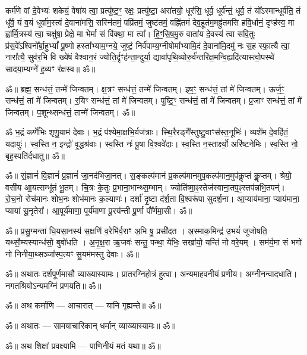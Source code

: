 कर्म॑णे वां दे॒वेभ्यः॑ शकेयं॒ वेषा॑य त्वा॒ प्रत्यु॑ष्ट॒ꣳ॒ रक्षः॒ प्रत्यु॑ष्टा॒ अरा॑तयो॒ धूर॑सि॒
धूर्व॒ धूर्व॑न्तं॒ धूर्व॒ तं यो᳚ऽस्मान्धूर्व॑ति॒ तं धू᳚र्व॒ यं व॒यं धूर्वा॑म॒स्त्वं दे॒वाना॑मसि॒
सस्नि॑तमं॒ पप्रि॑तमं॒ जुष्ट॑तमं॒ वह्नि॑तमं देव॒हूत॑म॒मह्रु॑तमसि हवि॒र्धानं॒ दृꣳह॑स्व॒ मा
ह्वा᳚र्मि॒त्रस्य॑ त्वा॒ चक्षु॑षा॒ प्रेक्षे॒ मा भेर्मा सं वि॑क्था॒ मा त्वा᳚।
हि॒ꣳ॒सि॒ष॒मु॒रु वाता॑य दे॒वस्य॑ त्वा सवि॒तुः प्र॑स॒वे᳚ऽश्विनो᳚र्बा॒हुभ्यां᳚ पू॒ष्णो
हस्ता᳚भ्याम॒ग्नये॒ जुष्टं॒ निर्व॑पाम्य॒ग्नीषोमा᳚भ्यामि॒दं दे॒वाना॑मि॒दमु॑ नः स॒ह स्फा॒त्यै त्वा॒
नारा᳚त्यै॒ सुव॑र॒भि वि ख्ये॑षं वैश्वान॒रं ज्योति॒र्दृꣳह॑न्ता॒न्दुर्या॒
द्यावा॑पृथि॒व्योरु॒र्व॑न्तरि॑क्ष॒मन्वि॒ह्यदि॑त्यास्त्वो॒पस्थे॑ सादया॒म्यग्ने॑ ह॒व्यꣳ र॑क्षस्व॥ ॐ॥

ॐ॥ ब्रह्म॒ सन्ध॑त्तं॒ तन्मे॑ जिन्वतम्।
क्ष॒त्रꣳ सन्ध॑त्तं॒ तन्मे॑ जिन्वतम्।
इष॒ꣳ॒ सन्ध॑त्तं॒ तां मे॑ जिन्वतम्।
ऊर्ज॒ꣳ॒ सन्ध॑त्तं॒ तां मे॑ जिन्वतम्।
र॒यिꣳ सन्ध॑त्तं॒ तां मे॑ जिन्वतम्।
पुष्टि॒ꣳ॒ सन्ध॑त्तं॒ तां मे॑ जिन्वतम्।
प्र॒जाꣳ सन्ध॑त्तं॒ तां मे॑ जिन्वतम्।
प॒शून्थ्सन्ध॑त्तं॒ तान्मे॑ जिन्वतम्। ॐ॥

ॐ भ॒द्रं कर्णे॑भिः शृणु॒याम॑ देवाः। भ॒द्रं प॑श्येमा॒क्षभि॒र्यज॑त्राः। 
स्थि॒रैरङ्गै᳚स्तुष्टु॒वाꣳस॑स्त॒नूभिः॑। व्यशे॑म दे॒वहि॑तं॒ यदायुः॑। 
स्व॒स्ति न॒ इन्द्रो॑ वृ॒द्धश्र॑वाः। स्व॒स्ति नः॑ पू॒षा वि॒श्ववे॑दाः। 
स्व॒स्ति न॒स्तार्क्ष्यो॒ अरि॑ष्टनेमिः। स्व॒स्ति नो॒ बृह॒स्पति॑र्दधातु॥ ॐ॥

ॐ॥ सं॒ज्ञानं॑ वि॒ज्ञानं॑ प्र॒ज्ञानं॑ जा॒नद॑भिजा॒नत्।
स॒ङ्कल्प॑मानं प्र॒कल्प॑मानमुप॒\-कल्प॑मान॒मुप॑कॢप्तं कॢ॒प्तम्।
श्रेयो॒ वसी॑य आ॒यत्सम्भू॑तं भू॒तम्।
चि॒त्रः के॒तुः प्र॒भाना॒भान्थ्स॒म्भान्।
ज्योति॑ष्मा॒ꣴ॒स्तेज॑स्वाना॒तप॒ꣴ॒\-स्तप॑न्नभि॒\-तपन्॑।
रो॒च॒नो रोच॑मानः शोभ॒नः शोभ॑मानः क॒ल्याणः॑।
दर्\mbox{}शा॑ दृ॒ष्टा द॑र्\mbox{}श॒ता वि॒श्वरू॑पा सुदर्\mbox{}श॒ना।
आ॒प्याय॑माना॒ प्याय॑माना॒ प्याया॑ सू॒नृतेरा᳚।
आ॒पूर्य॑माणा॒ पूर्य॑माणा पू॒रय॑न्ती पू॒र्णा पौ᳚र्णमा॒सी। ॐ॥

ॐ॥ प्र॒सु॒ग्मन्ता॑ धि॒यसा॒नस्य॑ स॒क्षणि॑ व॒रेभि॑र्व॒राꣳ अ॒भि षु॒ प्रसी॑दत । अ॒स्माक॒मिन्द्र॑ उ॒भयं॑
जुजोषति॒ यथ्सौ॒म्यस्यान्ध॑सो॒ बुबो॑धति । अ॒नृ॒क्ष॒रा ऋ॒जवः॑ सन्तु॒ पन्था॒ येभिः॒ सखा॑यो॒ यन्ति॑ नो
वरे॒यम् । सम॑र्य॒मा सं भगो॑ नो निनीया॒थ्सञ्जा᳚स्प॒त्यꣳ सु॒यम॑मस्तु देवाः। ॐ॥

ॐ॥ अथातः दर्शपूर्णमासौ व्याख्यास्यामः। प्रातरग्निहोत्रं हुत्वा। अन्यमाहवनीयं प्रणीय।
अग्नीनन्वादधाति। नगतश्रियोऽन्यमग्निं प्रणयति॥ ॐ॥ 

ॐ॥ अथ कर्माणि — आचारात् — यानि गृह्यन्ते॥ ॐ॥

ॐ॥ अथातः — सामयाचारिकान् धर्मान् व्याख्यास्यामः॥ ॐ॥

ॐ॥ अथ शिक्षां प्रवक्ष्यामि — पाणिनीयं मतं यथा॥ ॐ॥

